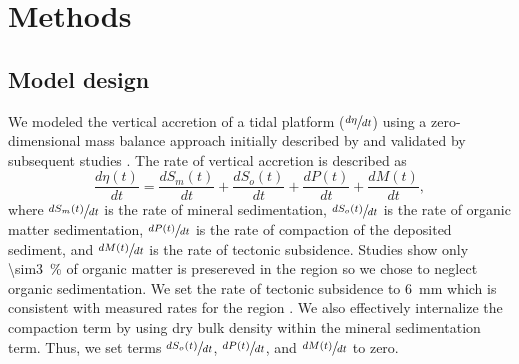 \section{Methods}

\subsection{Model design}

We modeled the vertical accretion of a tidal platform ($\sfrac{d\eta}{dt}$) using a zero-dimensional mass balance approach initially described by \citet{kroneMethodSimulatingMarsh1987} and validated by subsequent studies \citep{allenSaltmarshGrowthStratification1990, frenchNumericalSimulationVertical1993, temmermanModellingLongtermTidal2003,temmermanModellingEstuarineVariations2004}. The rate of vertical accretion is described as
\begin{equation}\label{eq:mass_bal}
	\frac{d\eta(t)}{dt} = \frac{dS_m(t)}{dt} + \frac{dS_o(t)}{dt} + \frac{dP(t)}{dt} + \frac{dM(t)}{dt},
\end{equation}
where $\sfrac{dS_m(t)}{dt}$ is the rate of mineral sedimentation, $\sfrac{dS_o(t)}{dt}$ is the rate of organic matter sedimentation, $\sfrac{dP(t)}{dt}$ is the rate of compaction of the deposited sediment, and $\sfrac{dM(t)}{dt}$ is the rate of tectonic subsidence. Studies  show only \SI{\sim3}{\percent} of organic matter is presereved in the region so we chose to neglect organic sedimentation. We set the rate of tectonic subsidence to \SI{6}{\milli\meter} which is consistent with measured rates for the region \cite{higginsInSARMeasurementsCompaction2014a} .  We also effectively internalize the compaction term by using dry bulk density within the mineral sedimentation term. Thus, we set terms $\sfrac{dS_o(t)}{dt}$, $\sfrac{dP(t)}{dt}$, and $\sfrac{dM(t)}{dt}$ to zero.

